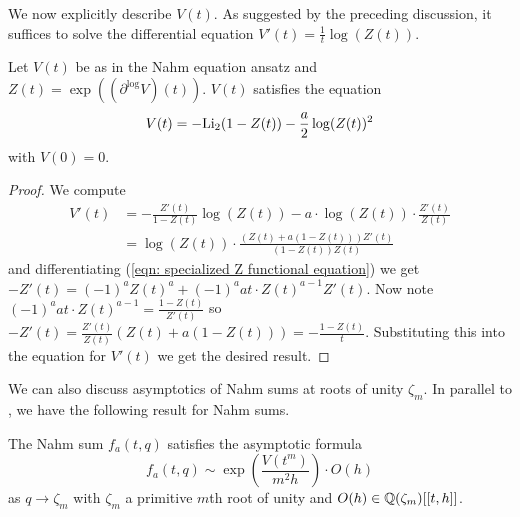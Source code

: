 We now explicitly describe $V(t)$. As suggested by the preceding discussion, it suffices to solve the differential equation $V'(t)=\frac{1}{t}\log(Z(t))$. 
\begin{proposition}\label{prop: V t dilogarithm equation}
    Let $V(t)$ be as in the Nahm equation ansatz and $Z(t)=\exp((\partial^{\log}V)(t))$. $V(t)$ satisfies the equation 
    \begin{equation}\label{eqn: V t dilogarithm equation}
        V(t) = -\mathrm{Li}_{2}(1-Z(t))-\frac{a}{2}\log(Z(t))^{2}
    \end{equation}
    with $V(0)=0$. 
\end{proposition}
\begin{proof}
    We compute 
    \begin{align*}
        V'(t) &= -\frac{Z'(t)}{1-Z(t)}\log(Z(t)) - a\cdot\log(Z(t))\cdot\frac{Z'(t)}{Z(t)} \\
        &= \log(Z(t))\cdot\frac{\left(Z(t)+a(1-Z(t))\right)Z'(t)}{(1-Z(t))Z(t)}
    \end{align*}
    and differentiating (\ref{eqn: specialized Z functional equation}) we get 
    $-Z'(t)=(-1)^{a}Z(t)^{a}+(-1)^{a}at\cdot Z(t)^{a-1}Z'(t)$. Now note $(-1)^{a}at\cdot Z(t)^{a-1}=\frac{1-Z(t)}{Z'(t)}$ so $-Z'(t)=\frac{Z'(t)}{Z(t)}\left(Z(t)+a(1-Z(t))\right)=-\frac{1-Z(t)}{t}$. Substituting this into the equation for $V'(t)$ we get the desired result. 
\end{proof}
We can also discuss asymptotics of Nahm sums at roots of unity $\zeta_{m}$. In parallel to , we have the following result for Nahm sums. 
\begin{theorem}\label{thm: Nahm sum asymptotics at roots of unity}
    The Nahm sum $f_{a}(t,q)$ satisfies the asymptotic formula 
    \begin{equation}\label{eqn: Nahm sum asymptotics at roots of unity}
        f_{a}(t,q)\sim\exp\left(\frac{V(t^{m})}{m^{2}h}\right)\cdot O(h)
    \end{equation}
    as $q\to\zeta_{m}$ with $\zeta_{m}$ a primitive $m$th root of unity and $O(h)\in\mathbb{Q}(\zeta_{m})[[t,h]]$. 
\end{theorem}
